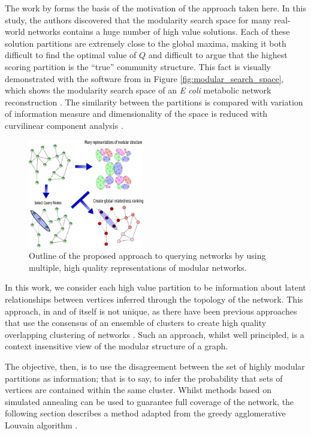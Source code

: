\documentclass[sigconf]{acmart}
\begin{document}
The work by \cite{good2010performance} forms the basis of the motivation of the approach taken here.
In this study, the authors discovered that the modularity search space for many real-world networks contains a huge number of high value solutions.
Each of these solution partitions are extremely close to the global maxima, making it both difficult to find the optimal value of $Q$ and difficult to argue that the highest scoring partition is the ``true'' community structure.
This fact is visually demonstrated with the software from \cite{good2010performance} in Figure \ref{fig:modular_search_space}, which shows the modularity search space of an \textit{E coli} metabolic network reconstruction \cite{GuimeraNature2005}.
The similarity between the partitions is compared with variation of information measure \cite{meilua2003comparing} and dimensionality of the space is reduced with curvilinear component analysis \cite{demartines1997curvilinear}.

\begin{figure}[ht]
    \centering
    \includegraphics[width=0.45\textwidth]{images/meth_fig/fig1_desc.eps}
    \caption{Outline of the proposed approach to querying networks by using multiple, high quality representations of modular networks.}
    \label{fig:algorithm_outline}
\end{figure}

In this work, we consider each high value partition to be information about latent relationships between vertices inferred through the topology of the network.
This approach, in and of itself is not unique, as there have been previous approaches that use the consensus of an ensemble of clusters to create high quality overlapping clustering of networks \cite{lancichinetti2012consensus}.
Such an approach, whilst well principled, is a context insensitive view of the modular structure of a graph.

The objective, then, is to use the disagreement between the set of highly modular partitions as information; that is to say, to infer the probability that sets of vertices are contained within the same cluster.
Whilst methods based on simulated annealing can be used to guarantee full coverage of the network, the following section describes a method adapted from the greedy agglomerative Louvain algorithm \cite{blondel2008fast}.
\end{document}
